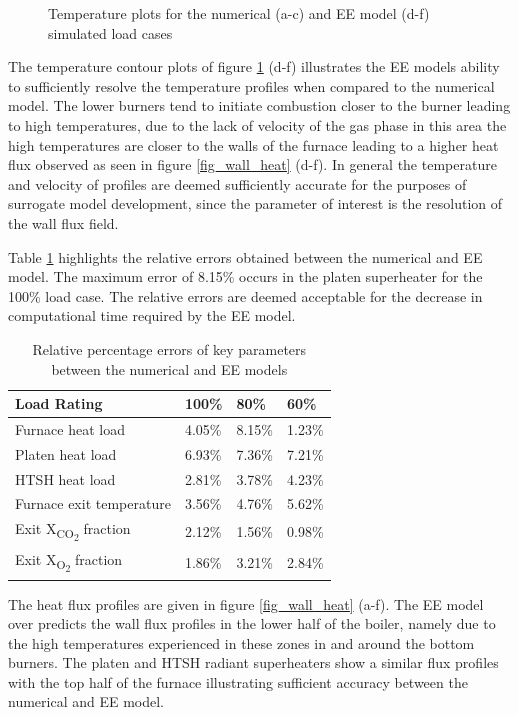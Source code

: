 \documentclass{webofc}
\begin{document}
\begin{figure}[h!]
\setlength{\belowcaptionskip}{0pt}
\caption{Temperature plots for the numerical (a-c) and EE model (d-f) simulated load cases}
\label{fig_temp}
\end{figure}

The temperature contour plots of figure \ref{fig_temp} (d-f) illustrates the EE models ability to sufficiently resolve the temperature profiles when compared to the numerical model. The lower burners tend to initiate combustion closer to the burner leading to high temperatures, due to the lack of velocity of the gas phase in this area the high temperatures  are closer to the walls of the furnace leading to a higher heat flux observed as seen in figure \ref{fig_wall_heat} (d-f). In general the temperature and velocity of profiles are deemed sufficiently accurate for the purposes of surrogate model development, since the parameter of interest is the resolution of the wall flux field.

Table \ref{tab_rel_err} highlights the relative errors obtained between the numerical and EE model. The maximum error of 8.15\% occurs in the platen superheater for the 100\% load case. The relative errors are deemed acceptable for the decrease in computational time required by the EE model.
\begin{table}[h!]
\centering
\caption{Relative percentage errors of key parameters between the numerical and EE models}\label{tab_rel_err}       
\begin{tabular}{llll}
\hline
Load Rating & 100\% & 80\% & 60\%   \\
\hline
Furnace heat load & 4.05\% & 8.15\% & 1.23\%   \\
Platen heat load & 6.93\% & 7.36\% & 7.21\%   \\
HTSH heat load & 2.81\% & 3.78\% & 4.23\%  \\
Furnace exit temperature & 3.56\% & 4.76\% & 5.62\%  \\
Exit X\textsubscript{CO\textsubscript{2}} fraction & 2.12\% & 1.56\% & 0.98\% \\
Exit X\textsubscript{O\textsubscript{2}} fraction & 1.86\% &3.21\% & 2.84\%\\
\hline
\end{tabular}
\end{table}

The heat flux profiles are given in figure \ref{fig_wall_heat} (a-f). The EE model over predicts the wall flux profiles in the lower half of the boiler, namely due to the high temperatures experienced in these zones in and around the bottom burners. The platen and HTSH radiant superheaters show a similar flux profiles with the top half of the furnace illustrating sufficient accuracy between the numerical and EE model.
\end{document}
